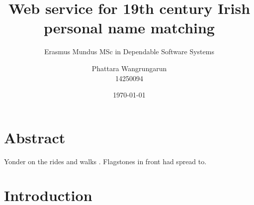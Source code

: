 \documentclass[a4paper, 11pt]{scrartcl}
\begin{document}
\title{Web service for 19th century Irish personal name matching}
\author{Phattara Wangrungarun\\14250094}
\subtitle{Erasmus Mundus MSc in Dependable Software Systems}
\date{\small\today}
\maketitle

\tableofcontents

\section*{Abstract}

Yonder on the rides and walks \citet{einstein}.
Flagstones in front had spread to.

\section{Introduction}


\end{document}
